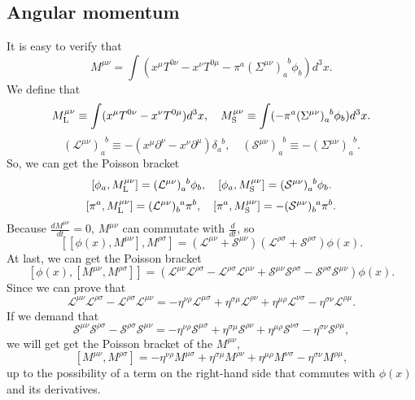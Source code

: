 \subsection{Angular momentum}
It is easy to verify that
\[M^{\mu \nu} = \int (x^{\mu}T^{0\nu}-x^{\nu}T^{0\mu}-\pi^a(\Sigma^{\mu \nu})_{a}^{\phantom{a}b}\phi_b) d^3 x.\]
We define that
\[M_{\rm L}^{\mu \nu} \equiv \int (x^{\mu}T^{0\nu}-x^{\nu}T^{0\mu}) d^3 x , \quad M_{\rm S}^{\mu \nu} \equiv \int (-\pi^a(\Sigma^{\mu \nu})_{a}^{\phantom{a}b}\phi_b) d^3 x.\]
\[(\mathcal{L}^{\mu \nu})_a^{\phantom{a}b} \equiv -(x^{\mu}\partial^{\nu}-x^{\nu}\partial^{\mu})\delta_a^{\phantom{a}b} , \quad (\mathcal{S}^{\mu \nu})_a^{\phantom{a}b} \equiv -(\Sigma^{\mu \nu})_a^{\phantom{a}b}.\]
So, we can get the Poisson bracket
\[[\phi_a,M_{\rm L}^{\mu \nu}] = (\mathcal{L}^{\mu \nu})_a^{\phantom{a}b} \phi_b , \quad [\phi_a,M_{\rm S}^{\mu \nu}] = (\mathcal{S}^{\mu \nu})_a^{\phantom{a}b} \phi_b.\]
\[[\pi^a,M_{\rm L}^{\mu \nu}] = (\mathcal{L}^{\mu \nu})_b^{\phantom{b}a}\pi^{b}  , \quad [\pi^a,M_{\rm S}^{\mu \nu}] = - (\mathcal{S}^{\mu \nu})_b^{\phantom{b}a} \pi^b .\]
Because $\frac{d M^{\mu \nu}}{dt} = 0$, $M^{\mu \nu}$ can commutate with $\frac{d}{dt}$, so
\[[[\phi(x),M^{\mu \nu}],M^{\rho \sigma}] = (\mathcal{L}^{\mu \nu}+\mathcal{S}^{\mu \nu})(\mathcal{L}^{\rho \sigma}+\mathcal{S}^{\rho \sigma})\phi(x).\]
At last, we can get the Poisson bracket 
\[[\phi(x),[M^{\mu \nu},M^{\rho \sigma}]] = (\mathcal{L}^{\mu \nu}\mathcal{L}^{\rho \sigma}-\mathcal{L}^{\rho \sigma}\mathcal{L}^{\mu \nu} + \mathcal{S}^{\mu \nu}\mathcal{S}^{\rho \sigma}-\mathcal{S}^{\rho \sigma}\mathcal{S}^{\mu \nu})\phi(x).\]
Since we can prove that
\[\mathcal{L}^{\mu \nu}\mathcal{L}^{\rho \sigma}-\mathcal{L}^{\rho \sigma}\mathcal{L}^{\mu \nu} = -\eta^{\nu \rho}\mathcal{L}^{\mu \sigma} + \eta^{\sigma \mu}\mathcal{L}^{\rho \nu} + \eta^{\mu \rho}\mathcal{L}^{\nu \sigma} - \eta^{\sigma \nu}\mathcal{L}^{\rho \mu}.\]
If we demand that
\[\mathcal{S}^{\mu \nu}\mathcal{S}^{\rho \sigma}-\mathcal{S}^{\rho \sigma}\mathcal{S}^{\mu \nu} = -\eta^{\nu \rho}\mathcal{S}^{\mu \sigma} + \eta^{\sigma \mu}\mathcal{S}^{\rho \nu} + \eta^{\mu \rho}\mathcal{S}^{\nu \sigma} - \eta^{\sigma \nu}\mathcal{S}^{\rho \mu},\]
we will get get the Poisson bracket of the $M^{\mu \nu}$,
\[[M^{\mu \nu},M^{\rho \sigma}] = -\eta^{\nu \rho}M^{\mu \sigma} + \eta^{\sigma \mu}M^{\rho \nu} + \eta^{\mu \rho}M^{\nu \sigma} - \eta^{\sigma \nu}M^{\rho \mu},\]
up to the possibility of a term on the right-hand side that commutes with $\phi(x)$ and its derivatives.
\\ \\
